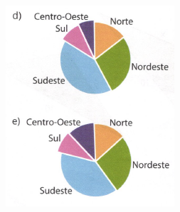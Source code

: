 \documentclass[a4paper,14pt]{article}
\begin{document}
\begin{multicols}{2}
\begin{enumerate}
			\includegraphics[width=1\linewidth]{6FMA119_imagens/imagem16}
		\end{enumerate}
		$~$ \\ $~$ \\ $~$ \\ $~$ \\ $~$ \\ $~$ \\ $~$ \\ $~$ \\ $~$ \\ $~$ \\ $~$ \\ $~$ \\ $~$ \\ $~$ \\ $~$ \\ $~$ \\ $~$ \\ $~$ \\ $~$ \\ $~$ \\ $~$ \\ $~$ \\ $~$ \\ $~$ \\ $~$ \\ $~$ \\ $~$
	\end{multicols}
\end{document}
